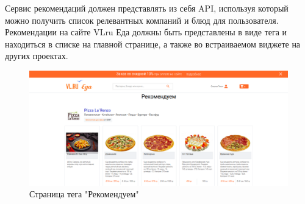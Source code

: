 Сервис рекомендаций должен представлять из себя API, используя который можно получить
список релевантных компаний и блюд для пользователя.
Рекомендации на сайте VLru Еда должны быть представлены в виде тега и находиться в
списке на главной странице, а также во встраиваемом виджете на других проектах.
\begin{figure}[H]
    \centering
    \includegraphics[scale=0.3]{images/tag_page.png}
    \caption{Страница тега "Рекомендуем"}
\end{figure}
